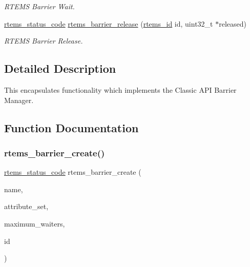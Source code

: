 \begin{DoxyCompactItemize}
\begin{DoxyCompactList}\small\item\em R\+T\+E\+MS Barrier Wait. \end{DoxyCompactList}\item 
\mbox{\hyperlink{group__ClassicStatus_ga545d41846817eaba6143d52ee4d9e9fe}{rtems\+\_\+status\+\_\+code}} \mbox{\hyperlink{group__ClassicBarrier_gaca341b3ac7701013f5e94cfff7b659d7}{rtems\+\_\+barrier\+\_\+release}} (\mbox{\hyperlink{group__ClassicTasks_gab20892b814dced7dd4e5b9bf42becd57}{rtems\+\_\+id}} id, uint32\+\_\+t $\ast$released)
\begin{DoxyCompactList}\small\item\em R\+T\+E\+MS Barrier Release. \end{DoxyCompactList}\end{DoxyCompactItemize}


\subsection{Detailed Description}
This encapsulates functionality which implements the Classic A\+PI Barrier Manager. 

\subsection{Function Documentation}
\mbox{\label{group__ClassicBarrier_gac0840f8a73784a6c2a97474bcc03cb42}} 
\subsubsection{\texorpdfstring{rtems\_barrier\_create()}{rtems\_barrier\_create()}}
{\footnotesize\ttfamily \mbox{\hyperlink{group__ClassicStatus_ga545d41846817eaba6143d52ee4d9e9fe}{rtems\+\_\+status\+\_\+code}} rtems\+\_\+barrier\+\_\+create (\begin{DoxyParamCaption}\item[{\mbox{\hyperlink{group__ClassicTasks_ga55fb63c49f68c0cbd9bee004da15b1fd}{rtems\+\_\+name}}}]{name,  }\item[{\mbox{\hyperlink{group__ClassicAttributes_gaea40313cf78ed843e09c4315d0a10f79}{rtems\+\_\+attribute}}}]{attribute\+\_\+set,  }\item[{uint32\+\_\+t}]{maximum\+\_\+waiters,  }\item[{\mbox{\hyperlink{group__ClassicTasks_gab20892b814dced7dd4e5b9bf42becd57}{rtems\+\_\+id}} $\ast$}]{id }\end{DoxyParamCaption})}



